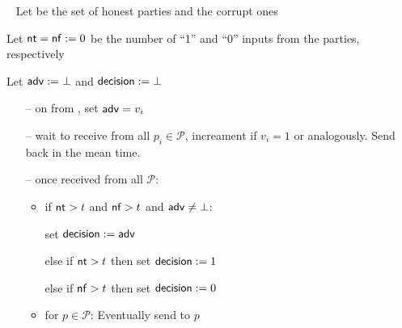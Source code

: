 \begin{minipage}{0.5\textwidth}
\begin{bbox}[title={Functionality $\F_\m{aba}(\mathcal{P})$}]
~
Let \honest be the set of honest parties and \crupt the corrupt ones

Let ${\mathsf {nt}} = {\mathsf {nf}} := 0$ be the number of ``1'' and ``0'' inputs from the parties, respectively

Let ${\mathsf {adv}} := \bot$ and ${\mathsf {decision}} := \bot$

\begin{itemize}
\item[--] on  from \A, set ${\mathsf {adv}} = v_i$

\item[--] wait to receive  from all $p_i \in \mathcal{P}$, increament  if $v_i = 1$ or  analogously. Send  back in the mean time.
    
\item[--] once received from all $\mathcal{P}$: 
\begin{itemize}
\item if ${\mathsf {nt}} > t$ and ${\mathsf {nf}} > t$ and ${\mathsf {adv}} \neq \bot$:

\quad set ${\mathsf {decision}} := {\mathsf {adv}}$

else if ${\mathsf {nt}} > t$ then set ${\mathsf {decision}} := 1$

else if ${\mathsf {nf}} > t$ then set ${\mathsf {decision}} := 0$

\item for $p \in \mathcal{P}$: Eventually send  to $p$
\end{itemize}

\end{itemize}

\end{bbox}
\end{minipage}
